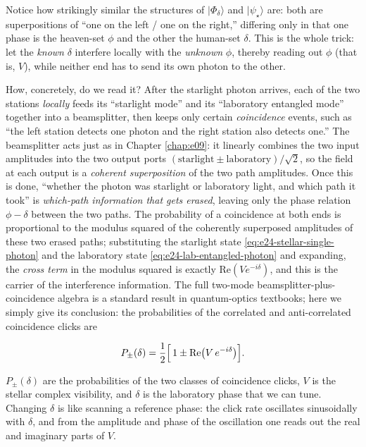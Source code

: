 Notice how strikingly similar the structures of \(|\Phi_\delta\rangle\) and \(|\psi_\star\rangle\) are: both are superpositions of ``one on the left / one on the right,'' differing only in that one phase is the heaven-set \(\phi\) and the other the human-set \(\delta\). This is the whole trick: let the \emph{known} \(\delta\) interfere locally with the \emph{unknown} \(\phi\), thereby reading out \(\phi\) (that is, \(V\)), while neither end has to send its own photon to the other.

How, concretely, do we read it? After the starlight photon arrives, each of the two stations \emph{locally} feeds its ``starlight mode'' and its ``laboratory entangled mode'' together into a beamsplitter, then keeps only certain \emph{coincidence} events, such as ``the left station detects one photon and the right station also detects one.'' The beamsplitter acts just as in Chapter \ref{chap:e09}: it linearly combines the two input amplitudes into the two output ports \((\text{starlight}\pm\text{laboratory})/\sqrt2\), so the field at each output is a \emph{coherent superposition} of the two path amplitudes. Once this is done, ``whether the photon was starlight or laboratory light, and which path it took'' is \emph{which-path information that gets erased}, leaving only the phase relation \(\phi-\delta\) between the two paths. The probability of a coincidence at both ends is proportional to the modulus squared of the coherently superposed amplitudes of these two erased paths; substituting the starlight state \eqref{eq:e24-stellar-single-photon} and the laboratory state \eqref{eq:e24-lab-entangled-photon} and expanding, the \emph{cross term} in the modulus squared is exactly \(\mathrm{Re}(V e^{-i\delta})\), and this is the carrier of the interference information. The full two-mode beamsplitter-plus-coincidence algebra is a standard result in quantum-optics textbooks; here we simply give its conclusion: the probabilities of the correlated and anti-correlated coincidence clicks are

\begin{equation}
  P_{\pm}(\delta)
  =
  \frac{1}{2}
  \Bigl[\,1\pm\mathrm{Re}\!\left(V\,e^{-i\delta}\right)\Bigr].
  \label{eq:e24-gjc-probability}
\end{equation}
\begin{formulaexplain}
\(P_\pm(\delta)\) are the probabilities of the two classes of coincidence clicks, \(V\) is the stellar complex visibility, and \(\delta\) is the laboratory phase that we can tune. Changing \(\delta\) is like scanning a reference phase: the click rate oscillates sinusoidally with \(\delta\), and from the amplitude and phase of the oscillation one reads out the real and imaginary parts of \(V\).
\end{formulaexplain}

